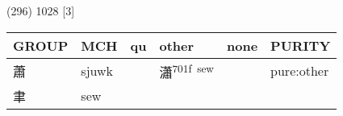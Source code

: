 \documentclass[14pt,a4paper]{scrartcl}
\begin{document}
(296) 1028 {[}3{]}

\begin{longtable}[c]{@{}llllll@{}}
\toprule
\begin{minipage}[b]{0.14\columnwidth}\raggedright\strut
GROUP
\strut\end{minipage} &
\begin{minipage}[b]{0.14\columnwidth}\raggedright\strut
MCH
\strut\end{minipage} &
\begin{minipage}[b]{0.14\columnwidth}\raggedright\strut
qu
\strut\end{minipage} &
\begin{minipage}[b]{0.14\columnwidth}\raggedright\strut
other
\strut\end{minipage} &
\begin{minipage}[b]{0.14\columnwidth}\raggedright\strut
none
\strut\end{minipage} &
\begin{minipage}[b]{0.14\columnwidth}\raggedright\strut
PURITY
\strut\end{minipage}\tabularnewline
\midrule
\endhead
\begin{minipage}[t]{0.14\columnwidth}\raggedright\strut
蕭
\strut\end{minipage} &
\begin{minipage}[t]{0.14\columnwidth}\raggedright\strut
sjuwk
\strut\end{minipage} &
\begin{minipage}[t]{0.14\columnwidth}\raggedright\strut
\strut\end{minipage} &
\begin{minipage}[t]{0.14\columnwidth}\raggedright\strut
瀟\textsuperscript{701f~sew}
\strut\end{minipage} &
\begin{minipage}[t]{0.14\columnwidth}\raggedright\strut
\strut\end{minipage} &
\begin{minipage}[t]{0.14\columnwidth}\raggedright\strut
pure:other
\strut\end{minipage}\tabularnewline
\begin{minipage}[t]{0.14\columnwidth}\raggedright\strut
聿
\strut\end{minipage} &
\begin{minipage}[t]{0.14\columnwidth}\raggedright\strut
sew
\strut\end{minipage} &
\begin{minipage}[t]{0.14\columnwidth}\raggedright\strut
\strut\end{minipage} &

\end{longtable}
\end{document}
